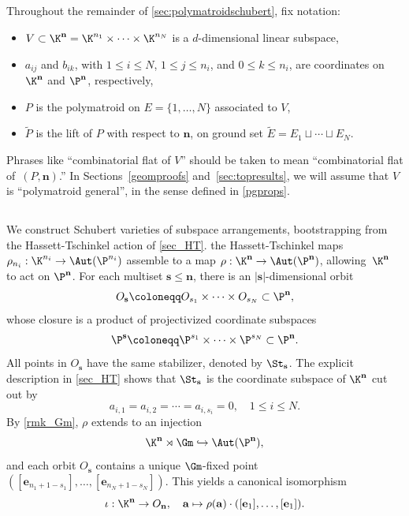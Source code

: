 \subsection{} Throughout the remainder of \cref{sec:polymatroidschubert}, fix notation:
\begin{itemize}
\item $V \subset \K^{\mathbf n} = \K^{n_1} \times \cdots \times \K^{n_N}$ is a $d$-dimensional linear subspace,
\item $a_{ij}$ and $b_{ik}$, with $1 \leq i \leq N$, $1 \leq j \leq n_i$, and $0 \leq k \leq n_i$, are coordinates on $\K^{\mathbf n}$ and $\P^{\mathbf n}$, respectively,
\item $P$ is the polymatroid on $E = \{1, \ldots, N\}$ associated to $V$,
\item $\widetilde P$ is the lift of $P$ with respect to $\mathbf n$, on ground set $\widetilde E = E_1 \sqcup \cdots \sqcup E_N$.
\end{itemize}
Phrases like ``combinatorial flat of $V$'' should be taken to mean ``combinatorial flat of~$(P, \mathbf n)$.''
In Sections~\ref{geomproofs} and~\ref{sec:topresults}, we will assume that $V$ is ``polymatroid general'', in the sense defined in \cref{pgprops}.

\subsection{}\label{polymatschubertdfn}
We construct Schubert varieties of subspace arrangements, bootstrapping from the Hassett-Tschinkel action of \cref{sec_HT}.
 the Hassett-Tschinkel maps $\rho_{n_i}: \K^{n_i} \to \Aut(\P^{n_i})$ assemble to a map
$\rho: \K^{\mathbf n} \to \Aut(\P^{\mathbf n})$, allowing~$\K^{\mathbf n}$ to act on $\P^{\mathbf n}$.
For each multiset $\mathbf s \leq \mathbf n$, there is an $|\mathbf s|$-dimensional orbit
\[
O_{\mathbf s} \coloneqq O_{s_1} \times \cdots \times O_{s_N} \subset \P^{\mathbf n},
\]
whose closure is a product of projectivized coordinate subspaces 
\[
\P^{\mathbf s} \coloneqq \P^{s_1} \times \cdots \times \P^{s_N} \subset \P^{\mathbf n}.
\]
All points in $O_{\mathbf s}$ have the same stabilizer, denoted by $\St_{\mathbf s}$.
The explicit description in \cref{sec_HT} shows that $\St_{\mathbf s}$ is the coordinate subspace of $\K^{\mathbf n}$ cut out by
\[
  a_{i,1} = a_{i,2} = \cdots = a_{i,s_i} = 0, \quad 1 \leq i \leq N.
\]
By \cref{rmk_Gm}, $\rho$ extends to an injection
\[ \K^{\mathbf n}  \rtimes \Gm \hookrightarrow \Aut(\P^{\mathbf n}), \]
and each orbit $O_{\mathbf s}$ contains a unique $\Gm$-fixed point $([\mathbf e_{n_1 +1 - s_1}], \ldots, [\mathbf e_{n_N +1 - s_N}])$.
This yields a canonical isomorphism
\[ \iota: \K^{\mathbf n} \to O_{\mathbf n},  \quad \mathbf a \mapsto \rho(\mathbf a) \cdot ([\mathbf e_{1}], \ldots, [\mathbf e_{1}]). \]

